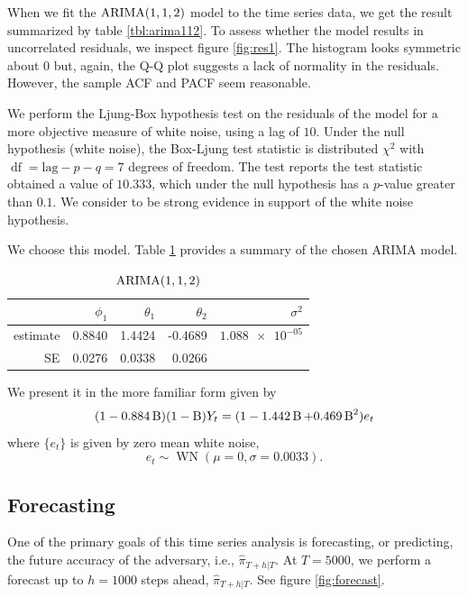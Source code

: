 \documentclass[final,
  11pt,
]{article}
\begin{document}
When we fit the \(\operatorname{ARIMA}(1,1,2)\) model to the time series data, we get
the result summarized by table \ref{tbl:arima112}.
To assess whether the model results in uncorrelated residuals, we
inspect figure \ref{fig:res1}.
The histogram looks symmetric about \(0\) but, again, the Q-Q plot suggests a
lack of normality in the residuals. However, the sample ACF and PACF
seem reasonable.

We perform the Ljung-Box hypothesis test on
the residuals of the model for a more objective measure of white noise,
using a lag of $10$.
Under the null hypothesis (white noise), the Box-Ljung test statistic is distributed
$\chi^2$ with $\operatorname{df} = \text{lag} - p - q = 7$ degrees of freedom.
The test reports the test statistic obtained a value of $10.333$, which
under the null hypothesis has a \(p\)-value greater than \(0.1\).
We consider to be strong evidence in support of the white noise hypothesis.

We choose this model.
Table \ref{tbl:arima112_complete} provides a summary of the chosen ARIMA model.

\begin{table}
    \centering
    \caption{$\operatorname{ARIMA}(1,1,2)$}
    \begin{tabular}[t]{r r r r r}
        \hline
                  &$\phi_1$ &$\theta_1$ & $\theta_2$ & $\sigma^2$\\
        \hline
        estimate  &    0.8840 &	    1.4424 & -0.4689 & $\num{1.088e-05}$\\
        SE		  &	   0.0276 &     0.0338 &  0.0266 &\\
        \hline
    \end{tabular}
    \label{tbl:arima112_complete}
\end{table}%

We present it in the more familiar form given by
\[
  (1 - 0.884 \operatorname{B})(1-\operatorname{B})Y_t = (1 - 1.442 \operatorname{B} + 0.469 \operatorname{B}^2) e_t
\]
where \(\{e_t\}\) is given by zero mean white noise,
\[
  e_t \sim \operatorname{WN}(\mu=0,\sigma=0.0033).
\]

\hypertarget{forecasting}{%
\subsection{Forecasting}\label{forecasting}}

One of the primary goals of this time series analysis is forecasting, or
predicting, the future accuracy of the adversary, i.e.,
\(\hat{\pi}_{T+h|T}\).
At \(T=5000\), we perform a forecast up to
\(h=1000\) steps ahead, \(\hat{\pi}_{T+h|T}\).
See figure \ref{fig:forecast}.
\end{document}
